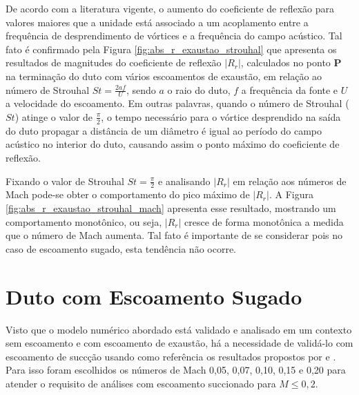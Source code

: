 De acordo com a literatura vigente, o aumento do coeficiente de reflexão para valores maiores que a unidade está associado a um acoplamento entre a frequência de desprendimento de vórtices e a frequência do campo acústico. Tal fato é confirmado pela Figura \ref{fig:abs_r_exaustao_strouhal} que apresenta os resultados de magnitudes do coeficiente de reflexão $|R_{r}|$, calculados no ponto $\textbf{P}$ na terminação do duto com vários escoamentos de exaustão, em relação ao número de Strouhal $St = \frac{2af}{U}$, sendo $a$ o raio do duto, $f$ a frequência da fonte e $U$ a velocidade do escoamento. Em outras palavras, quando o número de Strouhal ($St$) atinge o valor de $\frac{\pi}{2}$, o tempo necessário para o vórtice desprendido na saída do duto propagar a distância de um diâmetro é igual ao período do campo acústico no interior do duto, causando assim o ponto máximo do coeficiente de reflexão.

\begin{figure}[ht!]
\centering
  
\end{figure}

Fixando o valor de Strouhal $St = \frac{\pi}{2}$ e analisando $|R_{r}|$ em relação aos números de Mach pode-se obter o comportamento do pico máximo de $|R_{r}|$. A Figura \ref{fig:abs_r_exaustao_strouhal_mach} apresenta esse resultado, mostrando um comportamento monotônico, ou seja, $|R_{r}|$ cresce de forma monotônica a medida que o número de Mach aumenta. Tal fato é importante de se considerar pois no caso de escoamento sugado, esta tendência não ocorre.  

\begin{figure}[ht!]
\centering
  
\end{figure}

\newpage
\section{Duto com Escoamento Sugado}

Visto que o modelo numérico abordado está validado e analisado em um contexto sem escoamento e com escoamento de exaustão, há a necessidade de validá-lo com escoamento de succção usando como referência os resultados propostos por  e . Para isso foram escolhidos os números de Mach 0,05, 0,07, 0,10, 0,15 e 0,20 para atender o requisito de  análises com escoamento succionado para $M \leq 0,2$.


